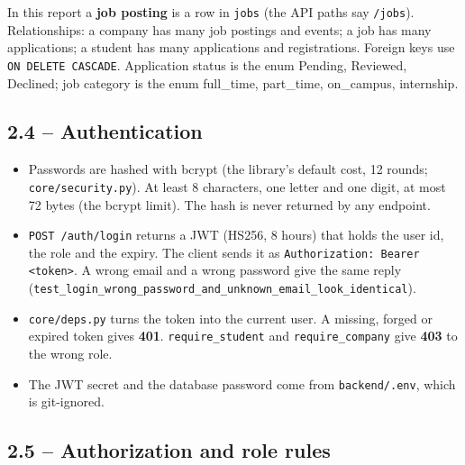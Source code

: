 \documentclass[11pt,letterpaper]{article}
\newcommand{\code}[1]{\texttt{#1}}
\begin{document}
In this report a \textbf{job posting} is a row in \code{jobs} (the API paths say \code{/\allowbreak{}jobs}). Relationships: a company has many job postings and events; a job has many applications; a student has many applications and registrations. Foreign keys use \code{ON DELETE CASCADE}. Application status is the enum Pending, Reviewed, Declined; job category is the enum full\_time, part\_time, on\_campus, internship.

\subsection*{2.4 -- Authentication}

\begin{itemize}
\item Passwords are hashed with bcrypt (the library's default cost, 12 rounds; \code{core/\allowbreak{}security.\allowbreak{}py}). At least 8 characters, one letter and one digit, at most 72 bytes (the bcrypt limit). The hash is never returned by any endpoint.
\item \code{POST /\allowbreak{}auth/\allowbreak{}login} returns a JWT (HS256, 8 hours) that holds the user id, the role and the expiry. The client sends it as \code{Authorization:\allowbreak{} Bearer <token>}. A wrong email and a wrong password give the same reply (\code{test\_\allowbreak{}login\_\allowbreak{}wrong\_\allowbreak{}password\_\allowbreak{}and\_\allowbreak{}unknown\_\allowbreak{}email\_\allowbreak{}look\_\allowbreak{}identical}).
\item \code{core/\allowbreak{}deps.\allowbreak{}py} turns the token into the current user. A missing, forged or expired token gives \textbf{401}. \code{require\_\allowbreak{}student} and \code{require\_\allowbreak{}company} give \textbf{403} to the wrong role.
\item The JWT secret and the database password come from \code{backend/\allowbreak{}.\allowbreak{}env}, which is git-ignored.
\end{itemize}

\subsection*{2.5 -- Authorization and role rules}
\end{document}
